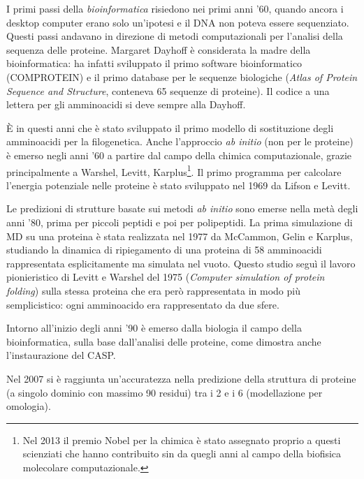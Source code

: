 I primi passi della \textit{bioinformatica }risiedono nei primi anni '60, quando ancora i desktop computer erano solo un'ipotesi e il DNA non poteva essere sequenziato. Questi passi andavano in direzione di metodi computazionali per l'analisi della sequenza delle proteine. Margaret Dayhoff è considerata la madre della bioinformatica: ha infatti sviluppato il primo software bioinformatico (COMPROTEIN) e il primo database per le sequenze biologiche (\textit{Atlas of Protein Sequence and Structure}, conteneva 65 sequenze di proteine). Il codice a una lettera per gli amminoacidi si deve sempre alla Dayhoff\supercite{gauthier2019brief}. 

\par È in questi anni che è stato sviluppato il primo modello di sostituzione degli amminoacidi per la filogenetica. Anche l'approccio \textit{ab initio} (non per le proteine) è emerso negli anni '60 a partire dal campo della chimica computazionale, grazie principalmente a Warshel, Levitt, Karplus\footnote{Nel 2013 il premio Nobel per la chimica è stato assegnato proprio a questi scienziati che hanno contribuito sin da quegli anni al campo della biofisica molecolare computazionale.}. Il primo programma per calcolare l'energia potenziale nelle proteine è stato sviluppato nel 1969 da Lifson e Levitt\supercite{levitt1969refinement}.

\par Le predizioni di strutture basate sui metodi \textit{ab initio} sono emerse nella metà degli anni '80, prima per piccoli peptidi e poi per polipeptidi. La prima simulazione di MD su una proteina è stata realizzata nel 1977 da McCammon, Gelin e Karplus\supercite{mccammon1977dynamics}, studiando la dinamica di ripiegamento di una proteina di 58 amminoacidi rappresentata esplicitamente ma simulata nel vuoto. Questo studio seguì il lavoro pionieristico di Levitt e Warshel del 1975 (\textit{Computer simulation of protein folding}\supercite{levitt1975computer}) sulla stessa proteina che era però rappresentata in modo più semplicistico: ogni amminoacido era rappresentato da due sfere. 

\par Intorno all'inizio degli anni '90 è emerso dalla biologia il campo della bioinformatica, sulla base dall'analisi delle proteine, come dimostra anche l'instaurazione del CASP.

\par Nel 2007 si è raggiunta un'accuratezza nella predizione della struttura di proteine (a singolo dominio con massimo 90 residui) tra i 2 e i 6 \angstrom (modellazione per omologia)\supercite{dill2008protein}.

